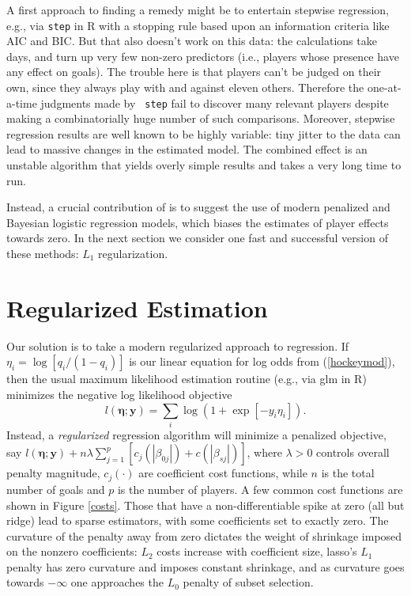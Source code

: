 A first approach to finding a remedy might be to entertain stepwise
regression, e.g., via {\tt step} in {\sf R} with a stopping rule based upon an
information criteria like AIC and BIC.  But that also doesn't work on this
data: the calculations take days, and turn up very few non-zero predictors
(i.e., players whose presence have any effect on goals).  The trouble here is
that players  can't be judged on their own, since they always play with and
against eleven others.  Therefore the one-at-a-time judgments made by {\tt
step} fail to discover many relevant players despite making a combinatorially
huge number of such comparisons.  Moreover, stepwise regression results are
well known to be highly variable: tiny jitter to the data can lead to massive
changes in the estimated model. The combined effect is an unstable algorithm
that yields overly simple results and takes a very long time to run.

Instead, a crucial contribution of
\cite{gramacy:jensen:taddy:2013} is to suggest the use of modern penalized and
Bayesian logistic regression models, which biases the estimates of player
effects towards zero. In the next section we consider one fast and successful
version of these methods: $L_1$ regularization.

\section{Regularized Estimation}
\label{sec:regularization}

Our solution is to take a modern regularized approach to regression.  If
$\eta_i = \log[ q_i/(1-q_i) ]$ is our linear equation for log odds from
(\ref{hockeymod}), then the usual maximum likelihood estimation routine (e.g.,
via {\sf glm} in {\sf R}) minimizes the negative log likelihood objective
\begin{equation}\label{eq:nllhd} l\left(\boldsymbol{\eta}; \mathbf{y}\right) =
\sum_i \log\left(1 + \exp[-y_i \eta_i]\right). \end{equation} Instead, a
\textit{regularized} regression algorithm will minimize a penalized objective,
say $ l\left(\boldsymbol{\eta}; \mathbf{y}\right) + n\lambda
\sum_{j=1}^p\left[ c_j\left(|\beta_{0j}|\right) +
c\left(|\beta_{sj}|\right)\right]$, where $\lambda>0$ controls overall penalty
magnitude, $c_j(\cdot)$ are coefficient cost functions, while $n$ is the total
number of goals and $p$ is the number of players.
A few common cost functions are shown in Figure \ref{costs}.  Those that have
a non-differentiable spike at zero (all but ridge) lead to sparse estimators,
with some coefficients set to exactly zero.   The curvature of the penalty
away from zero dictates the weight of shrinkage imposed on the nonzero
coefficients:  $L_2$ costs increase with coefficient size,  lasso's $L_1$
penalty has zero curvature and imposes constant shrinkage, and as curvature
goes towards $-\infty$ one approaches the $L_0$ penalty of subset selection.

